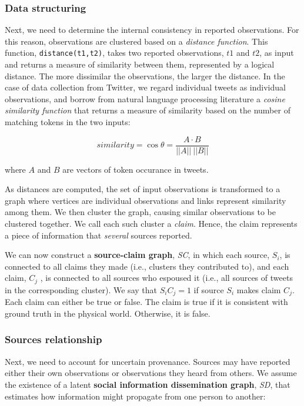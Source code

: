 \documentclass[a4paper,12pt]{article}
\begin{document}
\subsubsection{Data structuring}
Next, we need to determine the internal consistency in reported observations. For this reason, observations are clustered based on a \textit{distance function}. This function, \texttt{distance(t1,t2)}, takes two reported observations, $t1$ and $t2$, as input and returns a measure of similarity between them, represented by a logical distance. The more dissimilar the observations, the larger the distance. In the case of data collection from Twitter, we regard individual tweets as individual observations, and borrow from natural language processing literature a \textit{cosine similarity function} that returns a measure of similarity based on the number of matching tokens in the two inputs:

$$ similarity = \cos \theta = \frac{A \cdot B}{||A||\ ||B||} $$

where $A$ and $B$ are vectors of token occurance in tweets.

As distances are computed, the set of input observations is transformed to a graph where vertices are individual observations and links represent similarity among them. We then cluster the graph, causing similar observations to be clustered together. We call each such cluster a \textit{claim}. Hence, the claim represents a piece of information that \textit{several} sources reported.

We can now construct a \textbf{source-claim graph}, \textit{SC}, in which each source, $S_i$, is connected to all claims they made (i.e., clusters they contributed to), and each claim, $C_j$ , is connected to all sources who espoused it (i.e., all sources of tweets in the corresponding cluster). We say that $S_iC_j = 1$ if source $S_i$ makes claim $C_j$. Each claim can either be true or false. The claim is true if it is consistent with ground truth in the physical world. Otherwise, it is false.

\subsubsection{Sources relationship}
Next, we need to account for uncertain provenance. Sources may have reported either their own observations or observations they heard from others. We assume the existence of a latent \textbf{social information dissemination graph}, \textit{SD}, that estimates how information might propagate from one person to another:
\end{document}
